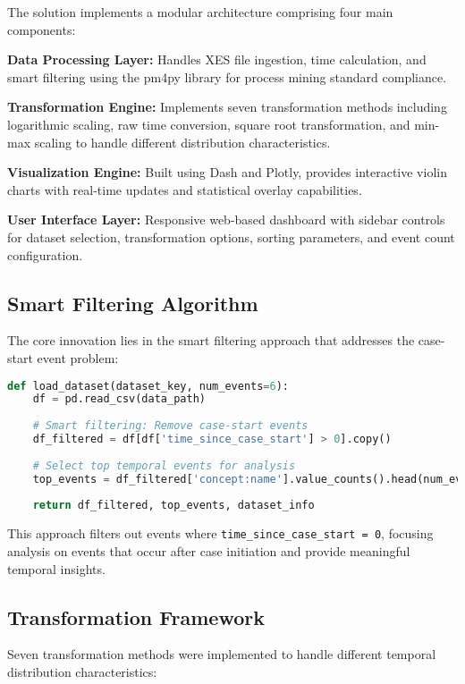 \documentclass[11pt,a4paper]{article}
\begin{document}
The solution implements a modular architecture comprising four main components:

\textbf{Data Processing Layer:} Handles XES file ingestion, time calculation, and smart filtering using the pm4py library for process mining standard compliance.

\textbf{Transformation Engine:} Implements seven transformation methods including logarithmic scaling, raw time conversion, square root transformation, and min-max scaling to handle different distribution characteristics.

\textbf{Visualization Engine:} Built using Dash and Plotly, provides interactive violin charts with real-time updates and statistical overlay capabilities.

\textbf{User Interface Layer:} Responsive web-based dashboard with sidebar controls for dataset selection, transformation options, sorting parameters, and event count configuration.

\subsection{Smart Filtering Algorithm}

The core innovation lies in the smart filtering approach that addresses the case-start event problem:

\begin{lstlisting}[language=Python, caption=Smart Filtering Implementation]
def load_dataset(dataset_key, num_events=6):
    df = pd.read_csv(data_path)
    
    # Smart filtering: Remove case-start events
    df_filtered = df[df['time_since_case_start'] > 0].copy()
    
    # Select top temporal events for analysis
    top_events = df_filtered['concept:name'].value_counts().head(num_events).index.tolist()
    
    return df_filtered, top_events, dataset_info
\end{lstlisting}

This approach filters out events where \texttt{time\_since\_case\_start = 0}, focusing analysis on events that occur after case initiation and provide meaningful temporal insights.

\subsection{Transformation Framework}

Seven transformation methods were implemented to handle different temporal distribution characteristics:
\end{document}
